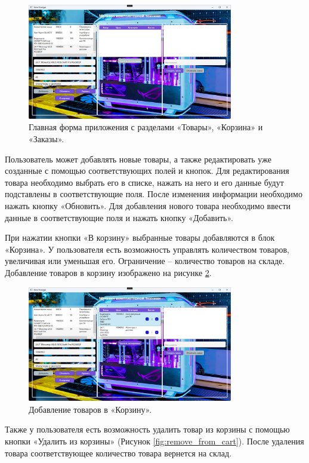 \documentclass[12pt]{article}
\numberwithin{listing}{section}
\numberwithin{figure}{section}
\begin{document}
\begin{figure}[H]
	\centering
	\includegraphics[width=0.8\textwidth]{fig/Рисунок 6.1.png}
	\caption{Главная форма приложения с разделами «Товары», «Корзина» и «Заказы».}
	\label{fig:main_form}
\end{figure}

Пользователь может добавлять новые товары, а также редактировать уже созданные с помощью соответствующих полей и кнопок. Для редактирования товара необходимо выбрать его в списке, нажать на него и его данные будут подставлены в соответствующие поля. После изменения информации необходимо нажать кнопку «Обновить». Для добавления нового товара необходимо ввести данные в соответствующие поля и нажать кнопку «Добавить».

При нажатии кнопки «В корзину» выбранные товары добавляются в блок «Корзина». У пользователя есть возможность управлять количеством товаров, увеличивая или уменьшая его. Ограничение – количество товаров на складе.
Добавление товаров в корзину изображено на рисунке \ref{fig:add_to_cart}.

\begin{figure}[H]
	\centering
	\includegraphics[width=0.8\textwidth]{fig/Рисунок 6.2.png}
	\caption{Добавление товаров в «Корзину».}
	\label{fig:add_to_cart}
\end{figure}

Также у пользователя есть возможность удалить товар из корзины с помощью кнопки «Удалить из корзины» (Рисунок \ref{fig:remove_from_cart}). После удаления товара соответствующее количество товара вернется на склад.
\end{document}
